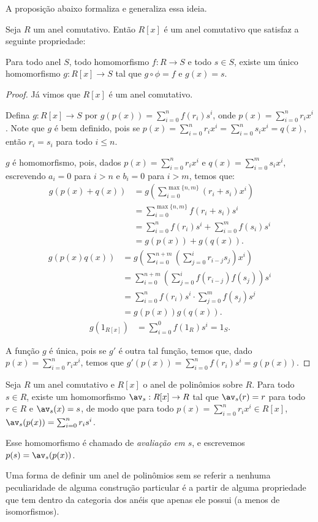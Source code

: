 A proposição abaixo formaliza e generaliza essa ideia.
\begin{prop}
    Seja $R$ um anel comutativo. Então
    $R[x]$ é um anel comutativo que satisfaz a seguinte propriedade:

    Para todo anel $S$, todo homomorfismo $f:R\rightarrow S$ e todo $s \in S$, existe um único homomorfismo $g:R[x]\rightarrow S$ tal que $g\circ \phi=f$ e $g(x)=s$.
\end{prop}
\begin{proof}
    Já vimos que $R[x]$ é um anel comutativo.

    Defina $g:R[x]\rightarrow S$ por $g(p(x))=\sum_{i=0}^n f(r_i)s^i$, onde $p(x)=\sum_{i=0}^n r_ix^i$.
    Note que $g$ é bem definido, pois se $p(x)=\sum_{i=0}^n r_ix^i=\sum_{i=0}^n s_ix^i=q(x)$, então $r_i=s_i$ para todo $i\leq n$.

    $g$ é homomorfismo, pois, dados $p(x)=\sum_{i=0}^n r_ix^i$ e $q(x)=\sum_{i=0}^m s_ix^i$, escrevendo $a_i=0$ para $i>n$ e $b_i=0$ para $i>m$, temos que:
    \begin{align*}
        g(p(x)+q(x))&=g\left(\sum_{i=0}^{\max\{n, m\}}(r_i+s_i)x^i\right)\\
        &=\sum_{i=0}^{\max\{n, m\}}f(r_i+s_i)s^i\\
        &=\sum_{i=0}^{n}f(r_i)s^i+\sum_{i=0}^{m}f(s_i)s^i\\
        &=g(p(x))+g(q(x)).
    \end{align*}
    \begin{align*}
        g(p(x)q(x))&=g\left(\sum_{i=0}^{n+m}\left(\sum_{j=0}^i r_{i-j}s_j\right)x^i\right)\\
        &=\sum_{i=0}^{n+m}\left(\sum_{j=0}^i f(r_{i-j})f(s_j)\right)s^i\\
        &=\sum_{i=0}^{n}f(r_i)s^i\cdot \sum_{j=0}^m f(s_j)s^j\\
        &=g(p(x))g(q(x)).
    \end{align*}
    \begin{align*}
        g(1_{R[x]})
        &=\sum_{i=0}^0 f(1_R)s^i=1_S.
    \end{align*}

    A função $g$ é única, pois se $g'$ é outra tal função, temos que, dado $p(x)=\sum_{i=0}^n r_ix^i$, temos que $g'(p(x))=\sum_{i=0}^nf(r_i)s^i=g(p(x))$.
\end{proof}

\begin{exemplo}
Seja $R$ um anel comutativo e $R[x]$ o anel de polinômios sobre $R$.
Para todo $s \in R$, existe um homomorfismo $\av_s:R[x]\rightarrow R$ tal que $\av_s(r)=r$ para todo $r \in R$ e $\av_s(x)=s$, de modo que para todo $p(x)=\sum_{i=0}^n r_ix^i\in R[x]$, $\av_s(p(x))=\sum_{i=0}^n r_is^i$.

Esse homomorfismo é chamado de \emph{avaliação em $s$}, e escrevemos $p(s)=\av_s(p(x))$.
\end{exemplo}
Uma forma de definir um anel de polinômios sem se referir a nenhuma peculiaridade de alguma construção particular é a partir de alguma propriedade que tem dentro da categoria dos anéis que apenas ele possui (a menos de isomorfismos).

